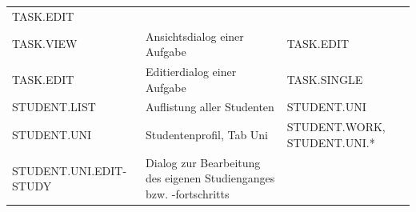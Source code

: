 \documentclass[
  12pt,
  ngerman,
  a4paper,
]{article}
\begin{document}
\begin{longtable}[]{@{}lll@{}}
\begin{minipage}[t]{0.28\columnwidth}
TASK.EDIT\strut
\end{minipage}\tabularnewline
\begin{minipage}[t]{0.27\columnwidth}\raggedright
TASK.VIEW\strut
\end{minipage} & \begin{minipage}[t]{0.35\columnwidth}\raggedright
Ansichtsdialog einer Aufgabe\strut
\end{minipage} & \begin{minipage}[t]{0.28\columnwidth}\raggedright
TASK.EDIT\strut
\end{minipage}\tabularnewline
\begin{minipage}[t]{0.27\columnwidth}\raggedright
TASK.EDIT\strut
\end{minipage} & \begin{minipage}[t]{0.35\columnwidth}\raggedright
Editierdialog einer Aufgabe\strut
\end{minipage} & \begin{minipage}[t]{0.28\columnwidth}\raggedright
TASK.SINGLE\strut
\end{minipage}\tabularnewline
\begin{minipage}[t]{0.27\columnwidth}\raggedright
STUDENT.LIST\strut
\end{minipage} & \begin{minipage}[t]{0.35\columnwidth}\raggedright
Auflistung aller Studenten\strut
\end{minipage} & \begin{minipage}[t]{0.28\columnwidth}\raggedright
STUDENT.UNI\strut
\end{minipage}\tabularnewline
\begin{minipage}[t]{0.27\columnwidth}\raggedright
STUDENT.UNI\strut
\end{minipage} & \begin{minipage}[t]{0.35\columnwidth}\raggedright
Studentenprofil, Tab Uni\strut
\end{minipage} & \begin{minipage}[t]{0.28\columnwidth}\raggedright
STUDENT.WORK, STUDENT.UNI.*\strut
\end{minipage}\tabularnewline
\begin{minipage}[t]{0.27\columnwidth}\raggedright
STUDENT.UNI.EDIT-STUDY\strut
\end{minipage} & \begin{minipage}[t]{0.35\columnwidth}\raggedright
Dialog zur Bearbeitung des eigenen Studienganges bzw.
-fortschritts\strut
\end{minipage} & \begin{minipage}[t]{0.28\columnwidth}\raggedright

\end{minipage}
\end{longtable}
\end{document}
